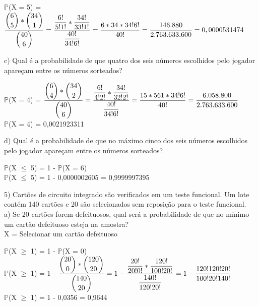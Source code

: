 \documentclass[12pt,a4paper,draft]{article}
\begin{document}
	\begin{center}
		\vspace{0.5cm}
		$\mathbb{P}$(X = 5) = $\dfrac{\dbinom{6}{5} * \dbinom{34}{1}}{\dbinom{40}{6}} = \dfrac{\dfrac{6!}{5!1!} * \dfrac{34!}{33!1!}}{\dfrac{40!}{34! 6!}} = \dfrac{6 * 34 * 34!6!}{40!} = \dfrac{146.880}{2.763.633.600} = 0,0000531474$
	\end{center}
	\vspace{1cm}
	c) Qual é a probabilidade de que quatro dos seis números escolhidos pelo jogador apareçam entre os números sorteados?
	\begin{center}
		\vspace{0.5cm}
		$\mathbb{P}$(X = 4) = $\dfrac{\dbinom{6}{4} * \dbinom{34}{2}}{\dbinom{40}{6}} = \dfrac{\dfrac{6!}{4!2!} * \dfrac{34!}{32!2!}}{\dfrac{40!}{34! 6!}} = \dfrac{15 * 561 * 34!6!}{40!} = \dfrac{6.058.800}{2.763.633.600}$\\ 
		\vspace{0.5cm}
		$\mathbb{P}$(X = 4) = 0,0021923311
	\end{center}
	\vspace{1cm}
	d) Qual é a probabilidade de que no máximo cinco dos seis números escolhidos pelo jogador apareçam entre os números sorteados?
	\begin{center}
		\vspace{0.5cm}
		$\mathbb{P}$(X $\leq$ 5) = 1 - $\mathbb{P}$(X = 6)
		\vspace{0.5cm}\\
		$\mathbb{P}$(X $\leq$ 5) = 1 - 0,0000002605 = 0,9999997395
\end{center}
	\vspace{1cm}
	5) Cartões de circuito integrado são verificados em um teste funcional. Um lote contém 140 cartões e 20 são selecionados sem reposição para o teste funcional.\\
	a) Se 20 cartões forem defeituosos, qual será a probabilidade de que no mínimo um cartão defeituoso esteja na amostra?
	\vspace{0.5cm}\\
	X = Selecionar um cartão defeituoso
	\begin{center}
		\vspace{0.5cm}
		$\mathbb{P}$(X $\geq$ 1) = 1 - $\mathbb{P}$(X = 0)
		\vspace{0.5cm}\\
		$\mathbb{P}$(X $\geq$ 1) = 1 - $\dfrac{\dbinom{20}{0} * \dbinom{120}{20}}{\dbinom{140}{20}} = 1 - \dfrac{\dfrac{20!}{20!0!} * \dfrac{120!}{100!20!}}{\dfrac{140!}{120!20!}} = 1 - \dfrac{120!120!20!}{100!20!140!}$
		\vspace{0.5cm}\\
		$\mathbb{P}$(X $\geq$ 1) = 1 - 0,0356 = 0,9644
	\end{center}
\end{document}
